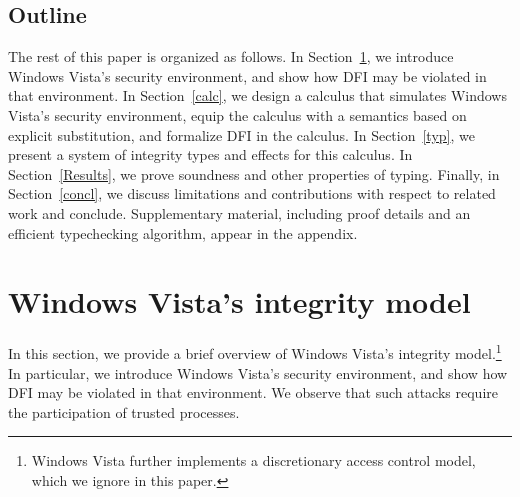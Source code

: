 \documentclass{sigplanconf}
\begin{document}
\subsection{Outline} The rest of this paper is organized as follows. 
In Section~\ref{overview},
we introduce Windows Vista's security environment, and show how DFI may be violated in that environment. 
In Section~\ref{calc}, we design a calculus that simulates Windows Vista's security environment, equip the calculus with a semantics based on explicit substitution, and formalize DFI in the calculus. 
In Section~\ref{typ}, we
present a system of integrity types and effects for this calculus.  In
Section~\ref{Results}, we prove soundness and other properties of typing. 
Finally, in Section~\ref{concl}, we
discuss limitations and contributions with respect to related work and
conclude. 
Supplementary material, including proof details and an efficient typechecking algorithm, appear in the appendix. 
















\section{Windows Vista's integrity model}\label{overview} 

In this section, we provide a brief overview of Windows Vista's integrity model.\footnote{Windows Vista further implements a discretionary access control model, which we ignore in this paper.} In particular, we introduce Windows Vista's security environment, and show how DFI may be violated in that environment. We observe that such attacks require the participation of trusted processes.
\end{document}
